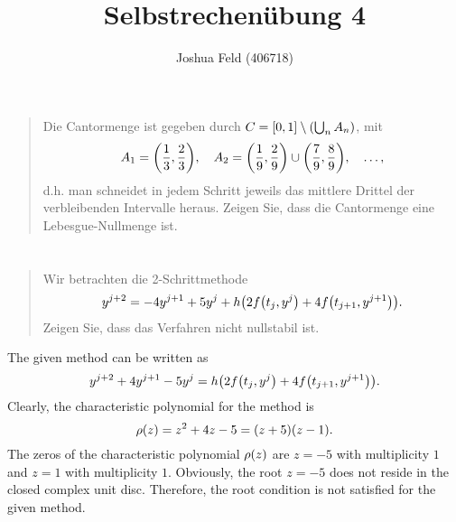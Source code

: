 \documentclass{exercise}
\title{Selbstrechenübung 4}
\author{Joshua Feld (406718)}
\begin{document}
	\maketitle


	\section{}

	\begin{quote}

	\end{quote}


	\section{}

	\begin{quote}
		Die Cantormenge ist gegeben durch \(C = \brackets*{0, 1} \setminus \parentheses*{\bigcup_n A_n}\), mit
		\[
			A_1 = \parentheses*{\frac{1}{3}, \frac{2}{3}}, \quad A_2 = \parentheses*{\frac{1}{9}, \frac{2}{9}} \cup \parentheses*{\frac{7}{9}, \frac{8}{9}}, \quad \ldots,
		\]
		d.h. man schneidet in jedem Schritt jeweils das mittlere Drittel der verbleibenden Intervalle heraus.
		Zeigen Sie, dass die Cantormenge eine Lebesgue-Nullmenge ist.
	\end{quote}


	\section{}

	\begin{quote}
		Wir betrachten die 2-Schrittmethode
		\[
			y^{j + 2} = -4y^{j + 1} + 5y^j + h\parentheses*{2f\parentheses*{t_j, y^j} + 4f\parentheses*{t_{j + 1}, y^{j + 1}}}.
		\]
		Zeigen Sie, dass das Verfahren nicht nullstabil ist.
	\end{quote}

	The given method can be written as
	\[
		y^{j + 2} + 4y^{j + 1} - 5y^j = h\parentheses*{2f\parentheses*{t_j, y^j} + 4f\parentheses*{t_{j + 1}, y^{j + 1}}}.
	\]
	Clearly, the characteristic polynomial for the method is
	\[
		\rho\parentheses*{z} = z^2 + 4z - 5 = \parentheses*{z + 5}\parentheses*{z - 1}.
	\]
	The zeros of the characteristic polynomial \(\rho\parentheses*{z}\) are \(z = -5\) with multiplicity \(1\) and \(z = 1\) with multiplicity \(1\).
	Obviously, the root \(z = -5\) does not reside in the closed complex unit disc.
	Therefore, the root condition is not satisfied for the given method.


	\section{}

	\begin{quote}
		
	\end{quote}
\end{document}
